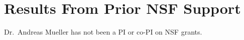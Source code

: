 \section{Results From Prior NSF Support}
Dr.\ Andreas Mueller has not been a PI or co-PI on NSF grants.


